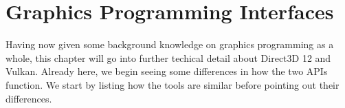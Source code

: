 \chapter{Graphics Programming Interfaces}\label{ch:graphics_programming_interfaces}
\begin{chaptermeta}
Having now given some background knowledge on graphics programming as a whole, this chapter will go into further techical detail about Direct3D 12 and Vulkan.
Already here, we begin seeing some differences in how the two \glspl{API} function.
We start by listing how the tools are similar before pointing out their differences.
\end{chaptermeta}



